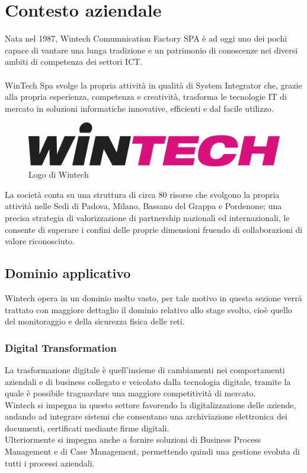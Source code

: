 \documentclass[Tesi.tex]{subfiles}
\begin{document}
\setcounter{chapter}{0}
\chapter{Contesto aziendale}

Nata nel 1987, Wintech Comumnication Factory SPA è ad oggi uno dei pochi  capace di vantare una lunga tradizione e un patrimonio di conoscenze nei diversi ambiti di competenza dei settori ICT. \\\\
WinTech Spa svolge la propria attività in qualità di System Integrator che, grazie alla propria esperienza, competenza e creatività, trasforma le tecnologie IT di mercato in soluzioni informatiche innovative, efficienti e dal facile utilizzo.\\
\begin{figure}[H]
	\centering
	\includegraphics[width=0.9\linewidth]{"images/LogoWintech"}
	\caption{Logo di Wintech}
	\label{fig:Logo di Wintech}
\end{figure}

La società conta su una struttura di circa 80 risorse che svolgono la propria attività nelle Sedi di Padova, Milano, Bassano del Grappa e Pordenone; una precisa strategia di valorizzazione di partnership nazionali ed internazionali, le consente di superare i confini delle proprie dimensioni fruendo di collaborazioni di valore riconosciuto.\\

\newpage
\section{Dominio applicativo}
Wintech opera in un dominio molto vasto, per tale motivo in questa sezione verrà trattato con maggiore dettaglio il dominio relativo allo stage svolto, cioè quello del monitoraggio e della sicurezza fisica delle reti. \\

\subsection{Digital Transformation}
La trasformazione digitale è quell'insieme di cambiamenti nei comportamenti aziendali e di business collegato e veicolato dalla tecnologia digitale, tramite la quale è possibile traguardare una maggiore competitività di mercato. \\
Wintech si impegna in questo settore favorendo la digitalizzazione delle aziende, andando ad integrare sistemi che consentano una archiviazione elettronica dei documenti, certificati mediante firme digitali. \\
Ulteriormente si impegna anche a fornire soluzioni di Business Process Management e di Case Management, permettendo quindi una gestione evoluta di tutti i processi aziendali.
\end{document}
